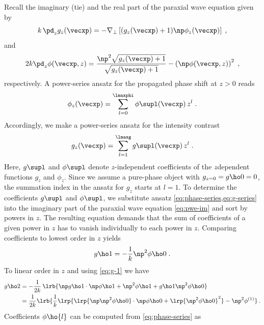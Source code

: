 \documentclass[
twoside,
openright,
titlepage,
numbers=noenddot,
headinclude,
fleqn,
a4paper,
footinclude=true,
cleardoublepage=empty,
abstractoff,
BCOR=5mm,
paper=a4,
fontsize=11pt,
british,ngerman,american,
]{scrreprt}
\begin{document}
Recall the imaginary (\ac{tie}) and the real part of the paraxial wave
equation given by
\begin{equation}
  \label{eq:pwe-im}
  k\,\pd_z g_z(\vecxp) =
  -\nabla_\perp\left[(g_z(\vecxp)+1)\np\phi_z(\vecxp)\right] \;,
\end{equation}
and
\begin{equation}
  \label{eq:pwe-real}
    2k\pd_z\phi(\vecxp,z)=
  \frac{\np^2\sqrt{g_z(\vecxp)+1}}{\sqrt{g_z(\vecxp)+1}}
  -\left(\np\phi(\vecxp,z)\right)^2 \;,
\end{equation}
respectively. A power-series ansatz for the propagated phase shift
at $z>0$ reads
\begin{equation}
  \label{eq:phase-series}
    \phi_z(\vecxp)=\sum_{l=0}^\lmaxphi\phi\supl(\vecxp)\,z^l \;.
\end{equation}
Accordingly, we make a power-series ansatz for the intensity contrast
\begin{equation}
  \label{eq:g-series}
    g_z(\vecxp)=\sum_{l=1}^\lmaxg g\supl(\vecxp)\,z^l \;.
\end{equation}
Here, $g\supl$ and $\phi\supl$ denote $z$-independent coefficients of
the $z$\hyph dependent functions $g_z$ and $\phi_z$.  Since we assume
a pure-phase object with $g_{z=0}=g\ho0=0$, the summation index in the
ansatz for $g_z$ starts at $l=1$.  To determine the coefficients
$g\supl$ and $\phi\supl$, we substitute ansatz
\cref{eq:phase-series,eq:g-series} into the imaginary part of the
paraxial wave equation \eqref{eq:pwe-im} and sort by powers in $z$.
The resulting equation demands that the sum of coefficients of a given
power in $z$ has to vanish individually to each power in $z$.
Comparing coefficients to lowest order in $z$ yields
\begin{equation}
  \label{eq:g-1}
       g\ho1 = -\frac{1}{k}\np^2\phi\ho0 \;.
\end{equation}
To linear order in $z$ and using \cref{eq:g-1} we have
\begin{equation}
  \label{eq:g-2}
  \begin{split}
     g\ho2 & = -\frac{1}{2k}\,\lrb{ 
       \np g\ho1\cdot\np\phi\ho1 +\np^2\phi\ho1 +g\ho1\np^2\phi\ho0 }
    \\ & = \frac{1}{2k} \lrb{ \frac{1}{k}
      \lrp{ \lrp{\np\np^2\phi\ho0}\cdot\np\phi\ho0  +\lrp
        {\np^2\phi\ho0}^2}
      -\np^2\phi^{(1)} } \,.
  \end{split}
\end{equation}
Coefficients $\phi\ho{l}$ can be computed from 
\cref{eq:phase-series} as
\end{document}
